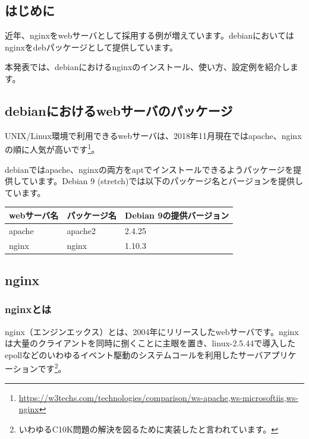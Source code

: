 \documentclass[mingoth,a4paper]{jsarticle}
\begin{document}


\subsection{はじめに}

近年、nginxをwebサーバとして採用する例が増えています。debianにおいてはnginxをdebパッケージとして提供しています。

本発表では、debianにおけるnginxのインストール、使い方、設定例を紹介します。


\subsection{debianにおけるwebサーバのパッケージ}

UNIX/Linux環境で利用できるwebサーバは、2018年11月現在ではapache、nginxの順に人気が高いです\footnote{\url{https://w3techs.com/technologies/comparison/ws-apache,ws-microsoftiis,ws-nginx}}。

debianではapache、nginxの両方をaptでインストールできるようパッケージを提供しています。Debian 9 (stretch)では以下のパッケージ名とバージョンを提供しています。

\begin{table}[htb]
  \begin{tabular}{|l|l|l|} \hline
    webサーバ名 & パッケージ名 & Debian 9の提供バージョン \\ \hline
    apache & apache2 & 2.4.25  \\ \hline
    nginx & nginx & 1.10.3 \\ \hline
  \end{tabular}
\end{table}

\subsection{nginx}

\subsubsection{nginxとは}

nginx（エンジンエックス）とは、2004年にリリースしたwebサーバです。nginxは大量のクライアントを同時に捌くことに主眼を置き、linux-2.5.44で導入したepollなどのいわゆるイベント駆動のシステムコールを利用したサーバアプリケーションです\footnote{いわゆるC10K問題の解決を図るために実装したと言われています。}。
\end{document}
